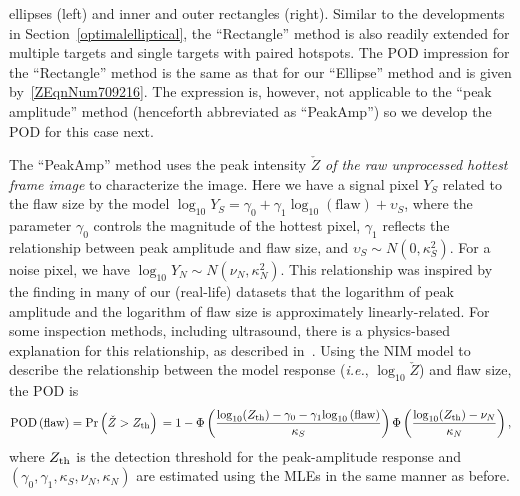 \documentclass[12pt]{article}
\begin{document}
ellipses (left) and inner and outer rectangles (right). 
Similar to the developments in Section~\ref{optimalelliptical}, the
``Rectangle'' method is also readily extended %
for multiple targets and single targets with paired hotspots. 
The POD impression for the ``Rectangle'' method is the same as
that for our ``Ellipse'' method and is given
by~\eqref{ZEqnNum709216}. The expression is, however, not applicable to
the ``peak amplitude'' method (henceforth abbreviated as ``PeakAmp'')
so we develop the POD for this case next. 

The ``PeakAmp'' method uses the peak intensity $\check Z$ {\em of
  the raw unprocessed hottest frame image} to characterize  the
image. Here we have a signal pixel $Y_S$ related to the flaw size
by the model $\log_{10} Y_S = \gamma_0 +\gamma_1  \log_{10}
(\mbox{flaw}) + \upsilon_S$, where the parameter $\gamma_0$
controls the magnitude of the hottest pixel, $\gamma_1$ reflects
the relationship between peak amplitude and flaw size, and $\upsilon_S\sim 
N(0,\kappa^2_S)$. For a noise pixel, we have $\log_{10} Y_N\sim N(\nu_N,
\kappa^2_N)$. This relationship was inspired by the finding 
in many of our (real-life) datasets that the logarithm of peak
amplitude and the logarithm of flaw size is approximately
linearly-related. For some inspection
methods, including ultrasound, there is a physics-based explanation
for this relationship, as described in~\citet{lietal14}.
Using the NIM model  to describe the relationship between 
the model response ({\em i.e.}, $\log _{10} \check Z$) and 
flaw size, the POD \citep[for detailed
  derivation, see Section~\ref{supp.deriv} or Equation~(3)
  of][]{liandmeeker09} is 
\begin{equation*}
{\rm POD}\left({\rm flaw}\right)  = \Pr \left(\check Z >Z_{{\rm th}} \right) \\
 =1-{\rm 
\Phi }\left(\frac{\log_{10}(Z_{\rm th}) - \gamma _{0} - \gamma _{1} {\rm log}_{10} \left({\rm flaw}\right)}{\kappa _{S} } \right)\Phi \left(\frac{\log _{10}(Z_{{\rm th}}) -\nu _{N} }{\kappa
_{N} } \right), 
\end{equation*}
where $Z_{{\rm th}}$ is the detection threshold for the peak-amplitude
response and $(\gamma_0,\gamma_1,\kappa_S,\nu_N,\kappa_N)$ are estimated
using the MLEs in the same manner as before. 
\end{document}
